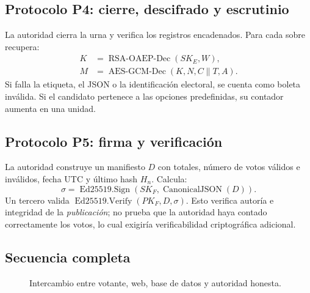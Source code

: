 \subsection{Protocolo P4: cierre, descifrado y escrutinio}
La autoridad cierra la urna y verifica los registros encadenados. Para cada sobre recupera:
\begin{align}
K&=\operatorname{RSA\text{-}OAEP\text{-}Dec}(SK_{E},W),\\
M&=\operatorname{AES\text{-}GCM\text{-}Dec}(K,N,C\|T,A).
\end{align}
Si falla la etiqueta, el JSON o la identificación electoral, se cuenta como boleta inválida. Si el candidato pertenece a las opciones predefinidas, su contador aumenta en una unidad.

\subsection{Protocolo P5: firma y verificación}
La autoridad construye un manifiesto $D$ con totales, número de votos válidos e inválidos, fecha UTC y último hash $H_n$. Calcula:
\begin{equation}
\sigma=\operatorname{Ed25519.Sign}(SK_{F},\operatorname{CanonicalJSON}(D)).
\end{equation}
Un tercero valida $\operatorname{Ed25519.Verify}(PK_F,D,\sigma)$. Esto verifica autoría e integridad de la \emph{publicación}; no prueba que la autoridad haya contado correctamente los votos, lo cual exigiría verificabilidad criptográfica adicional.

\subsection{Secuencia completa}
\begin{figure}[H]\centering
\resizebox{\linewidth}{!}{}
\caption{Intercambio entre votante, web, base de datos y autoridad honesta.}
\end{figure}
